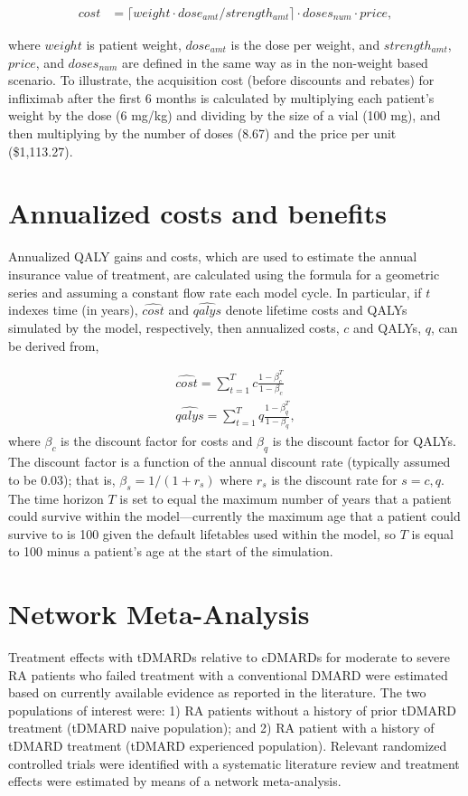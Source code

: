 \documentclass[11pt,final,fleqn]{article}\usepackage[]{graphicx}\usepackage[]{color}
\theoremstyle{plain}
\begin{document}
\begin{appendices}
\begin{align}
cost &= \lceil weight \cdot dose_{amt}/strength_{amt}\rceil \cdot doses_{num} \cdot price,
\end{align}

where $weight$ is patient weight, $dose_{amt}$ is the dose per weight, and $strength_{amt}$, $price$, and $doses_{num}$ are defined in the same way as in the non-weight based scenario. To illustrate, the acquisition cost (before discounts and rebates) for infliximab after the first 6 months is calculated by multiplying each patient's weight by the dose (6 mg/kg) and dividing by the size of a vial (100 mg), and then multiplying by the number of doses (8.67) and the price per unit (\$1,113.27). 

\section{Annualized costs and benefits}\label{app:insurance-value}
Annualized QALY gains and costs, which are used to estimate the annual insurance value of treatment, are calculated using the formula for a geometric series and assuming a constant flow rate each model cycle. In particular, if $t$ indexes time (in years), $\hat{cost}$ and $\hat{qalys}$ denote lifetime costs and QALYs simulated by the model, respectively, then annualized costs, $c$ and QALYs, $q$, can be derived from,  

\begin{align}
\hat{cost} = \sum_{t=1}^T c \frac{1-\beta_c^T}{1- \beta_c}\\
\hat{qalys} = \sum_{t=1}^T q \frac{1-\beta_q^T}{1- \beta_q},
\end{align}
where $\beta_c$ is the discount factor for costs and $\beta_q$ is the discount factor for QALYs. The discount factor is a function of the annual discount rate (typically assumed to be 0.03); that is, $\beta_s = 1/(1+r_s)$ where $r_s$ is the discount rate for $s=c,q$. The time horizon $T$ is set to equal the maximum number of years that a patient could survive within the model---currently the maximum age that a patient could survive to is 100 given the default lifetables used within the model, so $T$ is equal to 100 minus a patient's age at the start of the simulation.

\section{Network Meta-Analysis}\label{appendix:NMA}
Treatment effects with tDMARDs relative to cDMARDs for moderate to severe RA patients who failed treatment with a conventional DMARD were estimated based on currently available evidence as reported in the literature. The two populations of interest were: 1) RA patients without a history of prior tDMARD treatment (tDMARD naive population); and 2) RA patient with a history of tDMARD treatment (tDMARD experienced population). Relevant randomized controlled trials were identified with a systematic literature review and treatment effects were estimated by means of a network meta-analysis.

\end{appendices}
\end{document}
